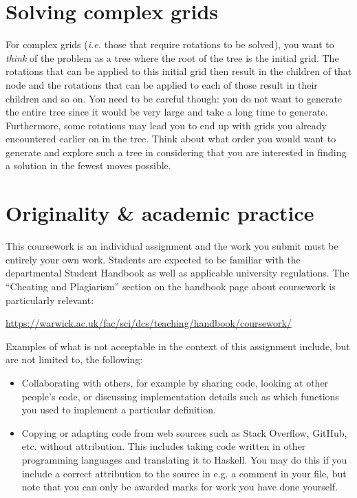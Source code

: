 \section{Solving complex grids}

For complex grids (\emph{i.e.} those that require rotations to be solved), you want to \emph{think} of the problem as a tree where the root of the tree is the initial grid. The rotations that can be applied to this initial grid then result in the children of that node and the rotations that can be applied to each of those result in their children and so on. You need to be careful though: you do not want to generate the entire tree since it would be very large and take a long time to generate. Furthermore, some rotations may lead you to end up with grids you already encountered earlier on in the tree. Think about what order you would want to generate and explore such a tree in considering that you are interested in finding a solution in the fewest moves possible.


\section{Originality \& academic practice}

This coursework is an individual assignment and the work you submit must be entirely your own work. Students are expected to be familiar with the departmental Student Handbook as well as applicable university regulations. The ``Cheating and Plagiarism'' section on the handbook page about coursework is particularly relevant:
\begin{center}\small
	\url{https://warwick.ac.uk/fac/sci/dcs/teaching/handbook/coursework/}
\end{center}
Examples of what is not acceptable in the context of this assignment include, but are not limited to, the following:
\begin{itemize}
	\item Collaborating with others, for example by sharing code, looking at other people's code, or discussing implementation details such as which functions you used to implement a particular definition. 
	
	\item Copying or adapting code from web sources such as Stack Overflow, GitHub, etc. without attribution. This includes taking code written in other programming languages and translating it to Haskell. You may do this if you include a correct attribution to the source in e.g. a comment in your file, but note that you can only be awarded marks for work you have done yourself. 
\end{itemize}

